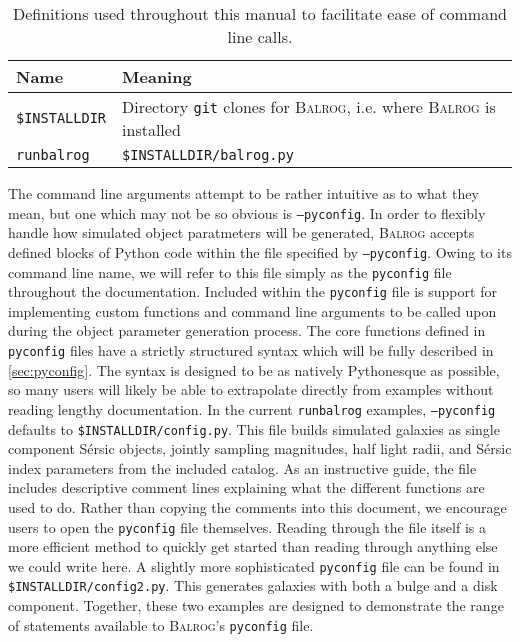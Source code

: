 \documentclass[11pt]{book}
\newcommand{\codett}[1]{\texttt{#1}}
\newcommand{\py}{Python}
\newcommand{\pyconfig}{\codett{pyconfig}}
\newcommand{\balrog}{\textsc{Balrog}}
\newcommand{\opt}[1]{\codett{--#1}}
\newcommand{\sersic}{S\'{e}rsic}
\begin{document}
\begin{table}
\caption{Definitions used throughout this manual to facilitate ease of command line calls.}
\label{tab:def}
\begin{tabular}{l l}
\toprule %
\rowcolor{gray2} \textbf{Name} & \textbf{Meaning} \\ \midrule
\texttt{\$}\lstinline{INSTALLDIR} & Directory \lstinline{git} clones for \balrog{}, i.e. where \balrog{} is installed \\ %
\lstinline{runbalrog} & \texttt{\$}\lstinline{INSTALLDIR/balrog.py} \\ \bottomrule %
\end{tabular}
\end{table}


The command line arguments attempt to be rather intuitive as to what they mean,
but one which may not be so obvious is \opt{pyconfig}.
In order to flexibly handle how simulated object paratmeters will be generated, \balrog{} accepts defined blocks of \py{} code
within the file specified by \opt{pyconfig}.
Owing to its command line name, we will refer to this file simply as the \pyconfig{} file
throughout the documentation.
Included within the \pyconfig{} file is support for implementing custom functions 
and command line arguments to be called upon during the object parameter generation process.
The core functions defined in \pyconfig{} files have a strictly
structured syntax which will be fully described in \autoref{sec:pyconfig}. 
The syntax is designed to be as natively \py{}esque as possible, so
many users will likely be able to extrapolate directly from examples without reading lengthy documentation. 
In the current \codett{runbalrog} examples, \opt{pyconfig} defaults to \codett{\$INSTALLDIR/config.py}.
This file builds simulated galaxies as single component \sersic{} objects, 
jointly sampling magnitudes, half light radii, and \sersic{} index parameters from the included catalog.
As an instructive guide, the file includes descriptive comment lines explaining what the different functions are used to do.
Rather than copying the comments into this document, we encourage users to open the \pyconfig{} file themselves.
Reading through the file itself is a more efficient method to quickly get started than
reading through anything else we could write here.
A slightly more sophisticated \pyconfig{} file can be found in \codett{\$INSTALLDIR/config2.py}.
This generates galaxies with both a bulge and a disk component.
Together, these two examples are designed to demonstrate the range of statements available to 
\balrog{}'s \pyconfig{} file.
\end{document}
